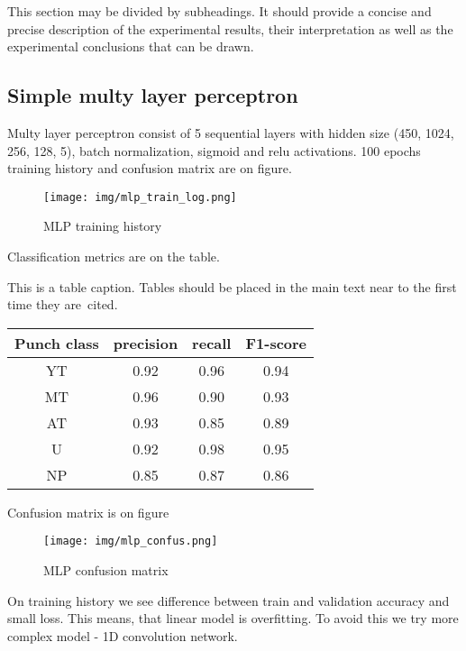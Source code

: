 \documentclass[sport,article,submit,moreauthors,pdftex]{Definitions/mdpi}
\begin{document}
This section may be divided by subheadings. It should provide a concise and precise description of the experimental results, their interpretation as well as the experimental conclusions that can be drawn.


\subsection{Simple multy layer perceptron}
Multy layer perceptron consist of 5 sequential layers with hidden size (450, 1024, 256, 128, 5), batch normalization, sigmoid and relu activations.
100 epochs training history and confusion matrix are on figure.



\begin{figure}[H]
\texttt{[image: img/mlp\_train\_log.png]}
\caption{MLP training history}
\end{figure} 


Classification metrics are on the table.

\begin{specialtable}[H] 
\caption{This is a table caption. Tables should be placed in the main text near to the first time they are~cited.\label{tab1}}

\begin{tabular}{cccc}
\toprule
\textbf{Punch class}	& \textbf{precision}	& \textbf{recall}	& \textbf{F1-score}\\
\midrule
YT		& 0.92		& 0.96		& 0.94\\
MT		& 0.96		& 0.90		& 0.93\\
AT		& 0.93		& 0.85		& 0.89\\
U		& 0.92		& 0.98		& 0.95\\
NP		& 0.85		& 0.87		& 0.86\\
\bottomrule
\end{tabular}
\end{specialtable}

Confusion matrix is on figure

\begin{figure}[H]
\texttt{[image: img/mlp\_confus.png]}
\caption{MLP confusion matrix}
\end{figure} 


On training history we see difference between train and validation accuracy and small loss.
This means, that linear model is overfitting.
To avoid this we try more complex model - 1D convolution network.
\end{document}
